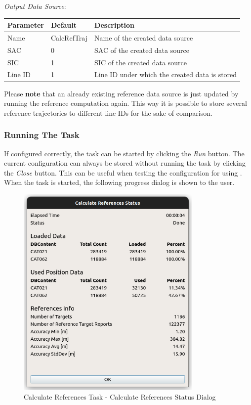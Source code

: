 \textit{Output Data Source}:
\begin{table}[H]
    \center
    \begin{tabularx}{\textwidth}{ | l | l | X |}
        \hline
        \textbf{Parameter} & \textbf{Default} & \textbf{Description} \\ \hline
        Name & CalcRefTraj & Name of the created data source \\ \hline
        SAC & 0 & SAC of the created data source \\ \hline
        SIC & 1 & SIC of the created data source \\ \hline
        Line ID & 1 & Line ID under which the created data is stored \\ \hline
    \end{tabularx}
\end{table}

Please \textbf{note} that an already existing reference data source is just updated by running the 
reference computation again. This way it is possible to store several reference trajectories to 
different line IDs for the sake of comparison.

\subsubsection{Running The Task}

If configured correctly, the task can be started by clicking the \textit{Run} button.
The current configuration can always be stored without running the task by clicking the \textit{Close} button. 
This can be useful when testing the configuration for using . \\

When the task is started, the following progress dialog is shown to the user.

\begin{figure}[H]
    \center
      \includegraphics[width=9cm]{figures/ui_task_references_dialog_result.png}
    \caption{Calculate References Task - Calculate References Status Dialog}
\end{figure}

